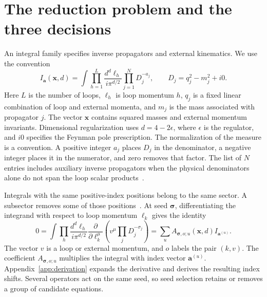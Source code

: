 \documentclass[11pt,a4paper]{article}
\begin{document}
\section{The reduction problem and the three decisions}
\label{sec:physics}
An integral family specifies inverse propagators and external kinematics. We use the convention~\cite{Weinzierl2022,KiraOriginal}
\begin{equation}
 I_{\boldsymbol a}(\boldsymbol x,d)=
 \int\prod_{h=1}^{L}\frac{d^d\ell_h}{i\pi^{d/2}}
 \prod_{j=1}^{N}D_j^{-a_j},\qquad D_j=q_j^2-m_j^2+i0.
 \label{eq:integral}
\end{equation}
Here $L$ is the number of loops, $\ell_h$ is loop momentum $h$, $q_j$ is a fixed linear combination of loop and external momenta, and $m_j$ is the mass associated with propagator $j$. The vector $\boldsymbol x$ contains squared masses and external momentum invariants. Dimensional regularization uses $d=4-2\epsilon$, where $\epsilon$ is the regulator, and $i0$ specifies the Feynman pole prescription. The normalization of the measure is a convention. A positive integer $a_j$ places $D_j$ in the denominator, a negative integer places it in the numerator, and zero removes that factor. The list of $N$ entries includes auxiliary inverse propagators when the physical denominators alone do not span the loop scalar products~\cite{Weinzierl2022}.

Integrals with the same positive-index positions belong to the same sector. A subsector removes some of those positions~\cite{KiraOriginal}. At seed $\boldsymbol\sigma$, differentiating the integrand with respect to loop momentum $\ell_k$ gives the identity~\cite{ChetyrkinTkachov}
\begin{equation}
 0=\int\prod_h\frac{d^d\ell_h}{i\pi^{d/2}}
 \frac{\partial}{\partial\ell_k^\mu}
 \left(v^\mu\prod_jD_j^{-\sigma_j}\right)
 =\sum_u A_{\boldsymbol\sigma,o;u}(\boldsymbol x,d)
 I_{\boldsymbol a^{(u)}}.
 \label{eq:identity}
\end{equation}
The vector $v$ is a loop or external momentum, and $o$ labels the pair $(k,v)$. The coefficient $A_{\boldsymbol\sigma,o;u}$ multiplies the integral with index vector $\boldsymbol a^{(u)}$. Appendix~\ref{app:derivation} expands the derivative and derives the resulting index shifts. Several operators act on the same seed, so seed selection retains or removes a group of candidate equations.
\end{document}
